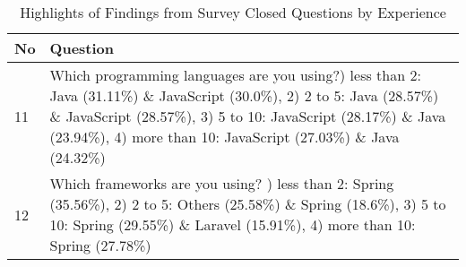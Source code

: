 \begin{table}[!ht]
    \centering
    \caption{Highlights of Findings from Survey Closed Questions by Experience}
    \begin{tabularx}{\textwidth}{v|k}
        \hline
        \textbf{No} & \textbf{Question}  \\ \hline
        
        11 & Which programming languages are you using?) less than 2: Java (31.11\%) \& JavaScript (30.0\%), 2) 2 to 5: Java (28.57\%) \& JavaScript (28.57\%), 3) 5 to 10: JavaScript (28.17\%) \& Java (23.94\%), 4) more than 10: JavaScript (27.03\%) \& Java (24.32\%)
        \\ \hline
        
        12 & Which frameworks are you using? ) less than 2: Spring (35.56\%), 2) 2 to 5: Others (25.58\%) \& Spring (18.6\%), 3) 5 to 10: Spring (29.55\%) \& Laravel (15.91\%), 4) more than 10: Spring (27.78\%)
        \\ \hline
        

\end{tabularx}
\end{table}
